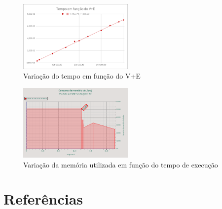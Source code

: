 \documentclass[12pt,a4paper]{article}
\begin{document}
\begin{figure}[h]
			\centering
			\includegraphics[width=0.5\textwidth]{ss_t(V+E)}
			\caption{Variação do tempo em função do V+E}
\end{figure}
\begin{figure}[h]
			\centering
			\includegraphics[width=0.5\textwidth]{ss_m(tex)}
			\caption{Variação da memória utilizada em função do tempo de execução}
\end{figure}

\section{Referências}
\end{document}
